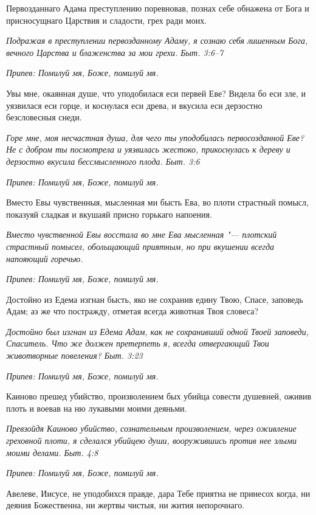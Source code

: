 Первозданнаго Адама преступлению поревновав, познах себе обнажена от Бога и присносущнаго Царствия и сладости, грех ради моих.


\itshape Подражая в преступлении первозданному Адаму, я сознаю себя лишенным Бога, вечного Царства и блаженства за мои грехи. Быт. 3:6–7\normalfont{}


\itshape Припев:\normalfont{} Помилуй мя, Боже, помилуй мя.


Увы мне, окаянная душе, что уподобилася еси первей Еве? Видела бо еси зле, и уязвилася еси горце, и коснулася еси древа, и вкусила еси дерзостно безсловесныя снеди.


\itshape Горе мне, моя несчастная душа, для чего ты уподобилась первосозданной Еве? Не с добром ты посмотрела и уязвилась жестоко, прикоснулась к дереву и дерзостно вкусила бессмысленного плода. Быт. 3:6\normalfont{}


\itshape Припев:\normalfont{} Помилуй мя, Боже, помилуй мя.


Вместо Евы чувственныя, мысленная ми бысть Ева, во плоти страстный помысл, показуяй сладкая и вкушаяй присно горькаго напоения.


\itshape Вместо чувственной Евы восстала во мне Ева мысленная "--- плотский страстный помысел, обольщающий приятным, но при вкушении всегда напояющий горечью.\normalfont{}


\itshape Припев:\normalfont{} Помилуй мя, Боже, помилуй мя.


Достойно из Едема изгнан бысть, яко не сохранив едину Твою, Спасе, заповедь Адам; аз же что постражду, отметая всегда животная Твоя словеса?


\itshape Достойно был изгнан из Едема Адам, как не сохранивший одной Твоей заповеди, Спаситель. Что же должен претерпеть я, всегда отвергающий Твои животворные повеления? Быт. 3:23\normalfont{}


\itshape Припев:\normalfont{} Помилуй мя, Боже, помилуй мя.


Каиново прешед убийство, произволением бых убийца совести душевней, оживив плоть и воевав на ню лукавыми моими деяньми.


\itshape Превзойдя Каиново убийство, сознательным произволением, через оживление греховной плоти, я сделался убийцею души, вооружившись против нее злыми моими делами. Быт. 4:8\normalfont{}


\itshape Припев:\normalfont{} Помилуй мя, Боже, помилуй мя.


Авелеве, Иисусе, не уподобихся правде, дара Тебе приятна не принесох когда, ни деяния Божественна, ни жертвы чистыя, ни жития непорочнаго.


